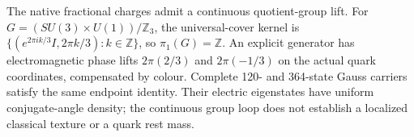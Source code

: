The native fractional charges admit a continuous quotient-group lift.
For $G=(SU(3)\times U(1))/\mathbb Z_3$, the universal-cover kernel is
$\{(e^{2\pi i k/3}I,2\pi k/3):k\in\mathbb Z\}$, so $\pi_1(G)=\mathbb Z$.
An explicit generator has electromagnetic phase lifts $2\pi(2/3)$ and
$2\pi(-1/3)$ on the actual quark coordinates, compensated by colour.
Complete 120- and 364-state Gauss carriers satisfy the same endpoint
identity. Their electric eigenstates have uniform conjugate-angle density;
the continuous group loop does not establish a localized classical texture
or a quark rest mass.
